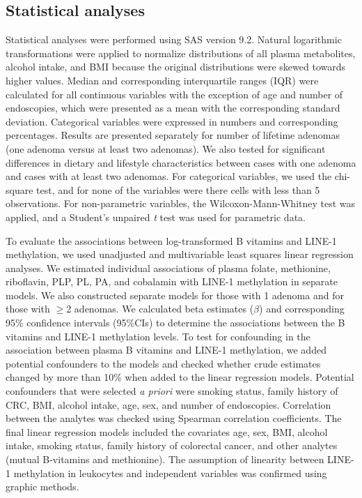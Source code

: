 \subsection{Statistical analyses} %
\noindent Statistical analyses were performed using SAS version 9.2. Natural logarithmic transformations were applied to normalize distributions of all plasma metabolites, alcohol intake, and BMI because the original distributions were skewed towards higher values. Median and corresponding interquartile ranges (IQR) were calculated for all continuous variables with the exception of age and number of endoscopies, which were presented as a mean with the corresponding standard deviation. Categorical variables were expressed in numbers and corresponding percentages. Results are presented separately for number of lifetime adenomas (one adenoma versus at least two adenomas). We also tested for significant differences in dietary and lifestyle characteristics between cases with one adenoma and cases with at least two adenomas. For categorical variables, we used the chi-square test, and for none of the variables were there cells with less than 5 observations. For non-parametric variables, the Wilcoxon-Mann-Whitney 
test was applied, and a Student's unpaired \emph{t} test was used for parametric data.

\noindent To evaluate the associations between log-transformed B vitamins and LINE-1 methylation, we used unadjusted and multivariable least squares linear regression analyses. We estimated individual associations of plasma folate, methionine, riboflavin, PLP, PL, PA, and cobalamin with LINE-1 methylation in separate models. We also constructed separate models for those with 1 adenoma and for those with $\geq$2 adenomas. We calculated beta estimates ($\beta$) and corresponding 95\% confidence intervals (95\%CIs) to determine the associations between the B vitamins and LINE-1 methylation levels. To test for confounding in the association between plasma B vitamins and LINE-1 methylation, we added potential confounders to the models and checked whether crude estimates changed by more than 10\% when added to the linear regression models. Potential confounders that were selected \emph{a priori} were smoking status, family history of CRC, BMI, alcohol intake, age, sex, and number of endoscopies. Correlation 
between the analytes was checked using Spearman correlation coefficients. The final linear regression models included the covariates age, sex, BMI, alcohol intake, smoking status, family history of colorectal cancer, and other analytes (mutual B-vitamins and methionine). The assumption of linearity between LINE-1 methylation in leukocytes and independent variables was confirmed using graphic methods.

